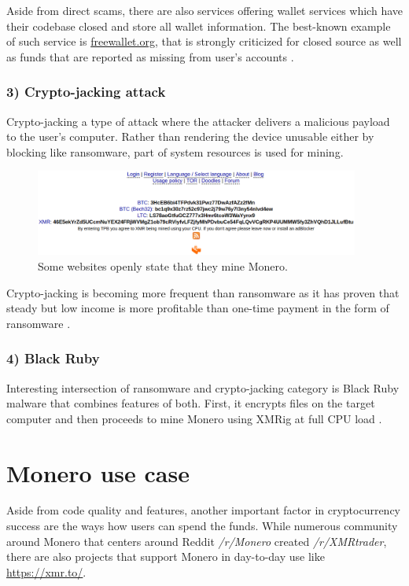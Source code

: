 \documentclass[
  printed, %
  table,   %
  lof,     %
  lot,     %
           oneside, color
]{fithesis3}
\begin{document}
Aside from direct scams, there are also services offering wallet services which have their codebase closed and store all wallet information. The best-known example of such service is \url{freewallet.org}, that is strongly criticized for closed source as well as funds that are reported as missing from user's accounts \cite{wijayamonero}.
\subsubsection{3) Crypto-jacking attack}
\label{cha:cryptojacking} 
Crypto-jacking a type of attack where the attacker delivers a malicious payload to the user's computer. Rather than rendering the device unusable either by blocking like ransomware, part of system resources is used for mining.

\begin{figure}[H]
\begin{center}

 \includegraphics[trim={0 0 0 0},clip,width=0.95\textwidth]{cryptojacking.png}
    \caption{Some websites openly state that they mine Monero.}
    \label{pic:monerokirk}
\end{center}
    \end{figure}

Crypto-jacking is becoming more frequent than ransomware as it has proven that steady but low income is more profitable than one-time payment in the form of ransomware \cite{higbee2018role}.

\subsubsection{4) Black Ruby}
Interesting intersection of ransomware and crypto-jacking category is Black Ruby malware that combines features of both. First, it encrypts files on the target computer and then proceeds to mine Monero using XMRig at full CPU load \cite{blackruby2018}.

\vspace{-1em}
\section{Monero use case}
Aside from code quality and features, another important factor in cryptocurrency success are the ways how users can spend the funds. While numerous community around Monero that centers around Reddit \textit{/r/Monero} created \textit{/r/XMRtrader}, there are also projects that support Monero in day-to-day use like \url{https://xmr.to/}.
\end{document}
